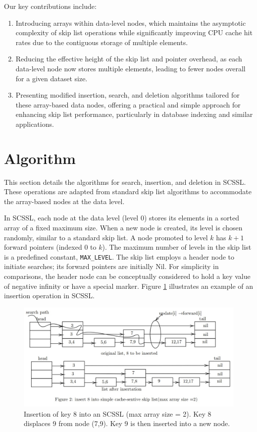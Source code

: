 \documentclass[sigconf, nonacm, letterpaper,top=2cm,bottom=2cm,left=3cm,right=3cm,marginparwidth=1.75cm]{acmart}
\begin{document}
Our key contributions include:
\begin{enumerate}
    \item Introducing arrays within data-level nodes, which maintains the asymptotic complexity of skip list operations while significantly improving CPU cache hit rates due to the contiguous storage of multiple elements.
    \item Reducing the effective height of the skip list and pointer overhead, as each data-level node now stores multiple elements, leading to fewer nodes overall for a given dataset size.
    \item Presenting modified insertion, search, and deletion algorithms tailored for these array-based data nodes, offering a practical and simple approach for enhancing skip list performance, particularly in database indexing and similar applications.
\end{enumerate}

\section{Algorithm}
This section details the algorithms for search, insertion, and deletion in SCSSL. These operations are adapted from standard skip list algorithms to accommodate the array-based nodes at the data level.

In SCSSL, each node at the data level (level 0) stores its elements in a sorted array of a fixed maximum size. When a new node is created, its level is chosen randomly, similar to a standard skip list. A node promoted to level $k$ has $k+1$ forward pointers (indexed 0 to $k$). The maximum number of levels in the skip list is a predefined constant, \texttt{MAX\_LEVEL}. The skip list employs a header node to initiate searches; its forward pointers are initially Nil. For simplicity in comparisons, the header node can be conceptually considered to hold a key value of negative infinity or have a special marker.
Figure \ref{fig:insertion_example} illustrates an example of an insertion operation in SCSSL.

\begin{figure}
      \centering
  \includegraphics[width=\linewidth]{figures/skipinsert.jpg}
\caption{Insertion of key 8 into an SCSSL (max array size = 2). Key 8 displaces 9 from node (7,9). Key 9 is then inserted into a new node.}
\label{fig:insertion_example}
\end{figure}
\end{document}
